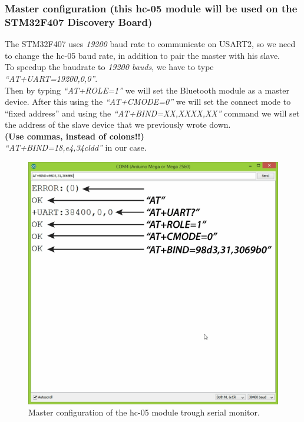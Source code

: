 \subsubsection{Master configuration (this hc-05 module will be used on the STM32F407 Discovery Board)}
The STM32F407 uses \textit{19200} baud rate to communicate on USART2, so we need to change the hc-05 baud rate, in addition to pair the master with his slave.\\
To speedup the baudrate to \textit{19200 bauds}, we have to type \textit{“AT+UART=19200,0,0”}.\\
Then by typing \textit{“AT+ROLE=1”} we will set the Bluetooth module as a master device. After this using the \textit{“AT+CMODE=0”} we will set the connect mode to “fixed address” and using the \textit{“AT+BIND=XX,XXXX,XX”} command we will set the address of the slave device that we previously wrote down.\\ \textbf{(Use commas, instead of colons!!)}\\
\textit{“AT+BIND=18,e4,34cldd”} in our case.\\
\begin{figure}[H]
	\centering
	\includegraphics[width=\textwidth]
	{files/images/hc05_master}
	\caption{Master configuration of the hc-05 module trough serial monitor.}
\end{figure}
 
